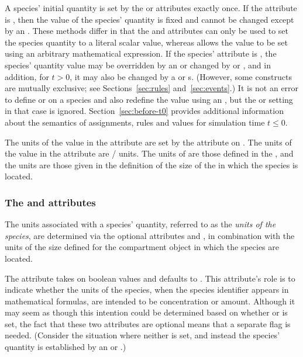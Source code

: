 A species' initial quantity is set by the  or
 attributes exactly once.
If the  attribute is ,
then the value of the species' quantity
is fixed and cannot be changed except
by an \InitialAssignment.  These methods differ in that the
 and 
attributes can only be used to set the species quantity
to a literal scalar value, whereas \InitialAssignment allows the
value to be set using an arbitrary mathematical expression.  If
the species'  attribute is ,
the species' quantity value may be overridden by an
\InitialAssignment or changed by \AssignmentRule or
\AlgebraicRule, and in addition, for $t > 0$, it may also be
changed by a \RateRule or \Event{}s. (However, some constructs are
mutually exclusive; see Sections~\ref{sec:rules}
and~\ref{sec:events}.) It is not an error to define
 or  on a species
and also redefine the value using an \InitialAssignment, but the
 or  setting in
that case is ignored.  Section~\ref{sec:before-t0} provides
additional information about the semantics of assignments, rules
and values for simulation time $t \leq 0$.

The units of the value in the 
attribute are set by the 
attribute on \Species.  The units of the
value in the  attribute are
/ units.  The units of
 are those defined in the
, and the  units are those
given in the definition of the size of the \Compartment
  in which the species is located.


\subsubsection{The  and
     attributes}
\label{sec:species-units}

The units associated with a species' quantity, referred to as the
\emph{units of the species}, are determined via the optional
attributes  and
, in combination with the
  units of the size defined for the compartment object
  in which the species are located.

The attribute  takes on boolean values
and defaults to .  This attribute's role is to indicate
whether the units of the species, when the species identifier
appears in mathematical formulas, are intended to be concentration
or amount.  Although it may seem as though this intention could be
determined based on whether  or
 is set, the fact that these two attributes are
optional means that a separate flag is needed.  (Consider the
situation where neither is set, and instead the species' quantity
is established by an \InitialAssignment or \AssignmentRule.)


